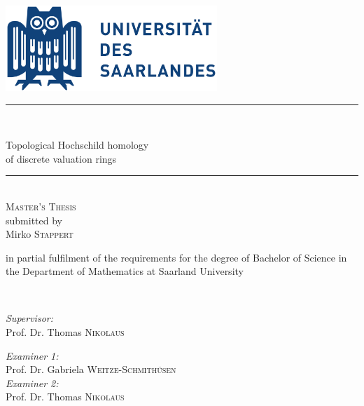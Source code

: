 \begin{titlepage}
\begin{center}

\vspace*{.1\textheight}
\includegraphics[width=8cm,keepaspectratio]{logo}\\[0.5cm]

\rule{.9\linewidth}{.6pt} \\[0.4cm] %
{\huge \bfseries
\begin{center}
Topological Hochschild homology \\
of discrete valuation rings
\end{center} \par}%
\rule{.9\linewidth}{.6pt} \\[0.4cm] %
\textsc{\large Master's Thesis}\\[0.5cm] %

\small submitted by\\[0.5cm]

\Large Mirko \textsc{Stappert}\\[0.5cm]

\begin{minipage}[t]{0.45\textwidth}
\begin{center}
{\small in partial fulfilment of the requirements for the degree of Bachelor of Science in the Department of Mathematics at Saarland University}
\end{center}
\end{minipage}\\[2cm]

\begin{minipage}[t]{0.4\textwidth}
\begin{flushleft} \large
\emph{Supervisor:}\\
Prof. Dr. Thomas \textsc{Nikolaus }\\[0.5cm]

\end{flushleft}
\end{minipage}
\begin{minipage}[t]{0.4\textwidth}
\begin{flushright} \large
\emph{Examiner 1:} \\
Prof. Dr. Gabriela \textsc{Weitze-Schmithüsen}\\[0.5cm]
\emph{Examiner 2:}\\
Prof. Dr. Thomas \textsc{Nikolaus}
\end{flushright}
\end{minipage}\\[3cm]

\vfill



\vfill
\end{center}
\end{titlepage}

